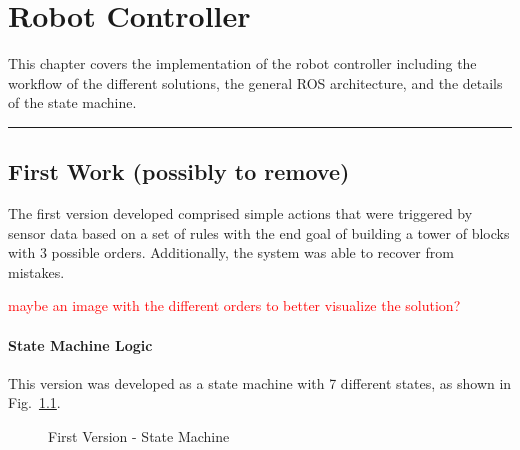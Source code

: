 \chapter{Robot Controller}
\label{chapter:robot_controller}

This chapter covers the implementation of the robot controller including the workflow of the different solutions, the general ROS architecture, and the details of the state machine.


{\color{red} \rule{\linewidth}{0.5mm}}

{\color{gray}
\section{First Work (possibly to remove)}

The first version developed comprised simple actions that were triggered by sensor data based on a set of rules with the end goal of building a tower of blocks with 3 possible orders. Additionally, the system was able to recover from mistakes.

\textcolor{red}{maybe an image with the different orders to better visualize the solution?}

\subsubsection{State Machine Logic}

This version was developed as a state machine with 7 different states, as shown in Fig.~\ref{fig:demo1_state_machine}.

\begin{figure}[H]%
    \centering
    
    \caption{First Version - State Machine}
    \label{fig:demo1_state_machine}
\end{figure}

}
